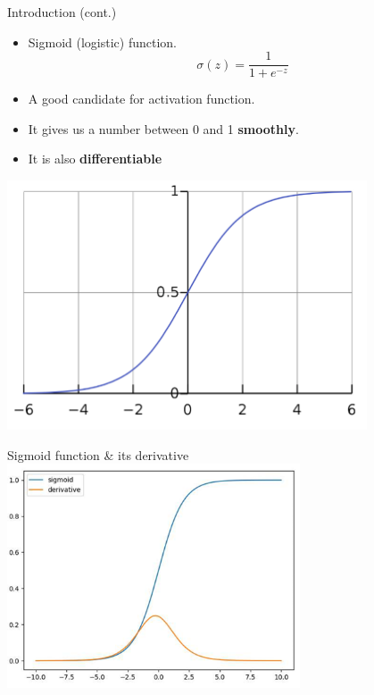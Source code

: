 \documentclass[serif, aspectratio=169]{beamer}
\begin{document}
\begin{frame}{Introduction (cont.)}
    \begin{minipage}{0.55\textwidth}
    \begin{itemize}
        \item Sigmoid (logistic) function.
        \[
            \sigma (z) = \frac{1}{1 + e^{-z}}
        \]
        \item A good candidate for activation function.
        
        \item It gives us a number between 0 and 1 \textbf{smoothly}.
        \item It is also \textbf{differentiable}

    \end{itemize}
    \end{minipage}%
    \begin{minipage}{0.4\textwidth}
        \centering
        \includegraphics[width=0.8\textwidth]{pic/sigmoid.png}
    \end{minipage}
\end{frame}
\begin{frame}{Sigmoid function \& its derivative}
    \centering
        \includegraphics[width=0.65\textwidth]{pic/sigmoidDer.png}
\end{frame}
\end{document}
